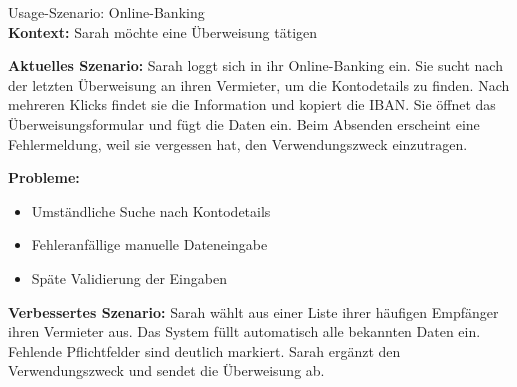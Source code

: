 \begin{example2}{Usage-Szenario: Online-Banking}\\
\textbf{Kontext:} Sarah möchte eine Überweisung tätigen

\textbf{Aktuelles Szenario:}
Sarah loggt sich in ihr Online-Banking ein. Sie sucht nach der letzten Überweisung an ihren Vermieter, um die Kontodetails zu finden. Nach mehreren Klicks findet sie die Information und kopiert die IBAN. Sie öffnet das Überweisungsformular und fügt die Daten ein. Beim Absenden erscheint eine Fehlermeldung, weil sie vergessen hat, den Verwendungszweck einzutragen.

\textbf{Probleme:}
\begin{itemize}
    \item Umständliche Suche nach Kontodetails
    \item Fehleranfällige manuelle Dateneingabe
    \item Späte Validierung der Eingaben
\end{itemize}

\textbf{Verbessertes Szenario:}
Sarah wählt aus einer Liste ihrer häufigen Empfänger ihren Vermieter aus. Das System füllt automatisch alle bekannten Daten ein. Fehlende Pflichtfelder sind deutlich markiert. Sarah ergänzt den Verwendungszweck und sendet die Überweisung ab.
\end{example2}

